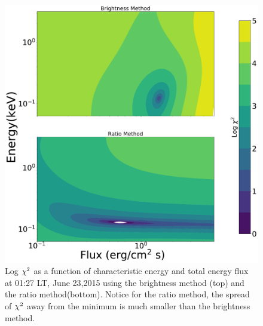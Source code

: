 \documentclass[crop=false,class=mitthesis,oneside,font=12pt]{standalone}
\begin{document}
\begin{figure}[H]
	\centering\includegraphics[width=32pc]{chi_b_vs_e_127.pdf}
	\caption{Log $\rm \chi^2$ as a function of characteristic energy and total energy flux at 01:27 LT, June 23,2015 using the brightness method (top) and the ratio method(bottom). Notice for the ratio method, the spread of $\rm \chi^2$ away from the minimum is much smaller than the brightness method.}
	\label{fig:chi_127}
\end{figure}
\end{document}
